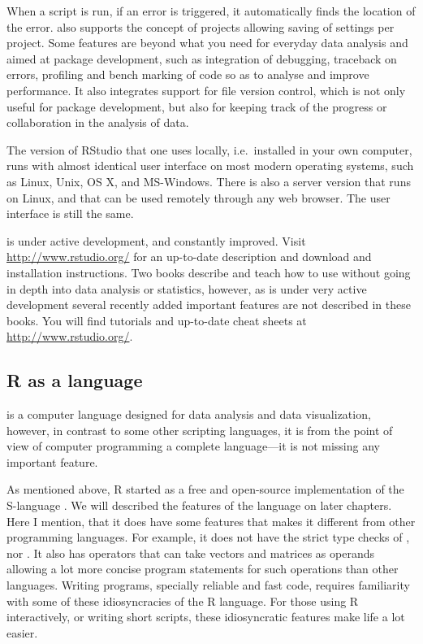\documentclass[krantz2,ChapterTOCs]{krantz}\usepackage{knitr}
\begin{document}
When a script is run, if an error is triggered, it automatically finds the location of the error. \RStudio also supports the concept of projects allowing saving of settings per project. Some features are beyond what you need for everyday data analysis and aimed at package development, such as integration of debugging, traceback on errors, profiling and bench marking of code so as to analyse and improve performance. It also integrates support for file version control, which is not only useful for package development, but also for keeping track of the progress or collaboration in the analysis of data.

The version of RStudio that one uses locally, i.e.\ installed in your own computer, runs with almost identical user interface on most modern operating systems, such as Linux, Unix, OS X, and MS-Windows. There is also a server version that runs on Linux, and that can be used remotely through any web browser. The user interface is still the same.

\RStudio is under active development, and constantly improved. Visit \url{http://www.rstudio.org/} for an up-to-date description and download and installation instructions. Two books \autocite{vanderLoo2012,Hillebrand2015} describe and teach how to use \RStudio without going in depth into data analysis or statistics, however, as \RStudio is under very active development several recently added important features are not described in these books. You will find tutorials and up-to-date cheat sheets at \url{http://www.rstudio.org/}.

\subsection{R as a language}

 is a computer language designed for data analysis and data visualization, however, in contrast to some other scripting languages, it is from the point of view of computer programming a complete language---it is not missing any important feature. 

As mentioned above, R started as a free and open-source implementation of the S-language \autocite{Becker1984,Becker1988}. We will described the features of the \Rlang language on later chapters. Here I mention, that it does have some features that makes it different from other programming languages. For example, it does not have the strict type checks of , nor  . It also has operators that can take vectors and matrices as operands allowing a lot more concise program statements for such operations than other languages. Writing programs, specially reliable and fast code, requires familiarity with some of these idiosyncracies of the R language. For those using R interactively, or writing short scripts, these idiosyncratic features make life a lot easier.
\end{document}
